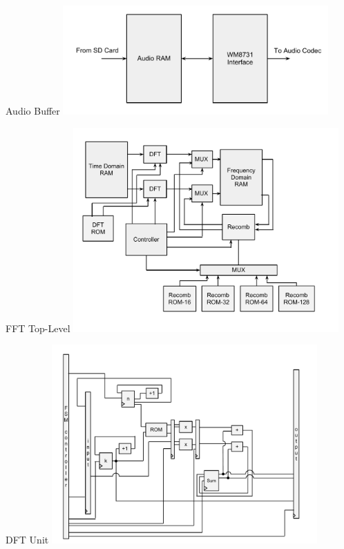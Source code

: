 \documentclass{beamer}
\begin{document}
\begin{frame}{Audio Buffer}
	\centering
	\includegraphics[width=4in]{audio-buffer}
\end{frame}

\begin{frame}{FFT Top-Level}
	\centering
	\includegraphics[width=4in]{fft-top}
\end{frame}

\begin{frame}{DFT Unit}
	\centering
	\includegraphics[width=4in]{dft-unit}
\end{frame}
\end{document}
